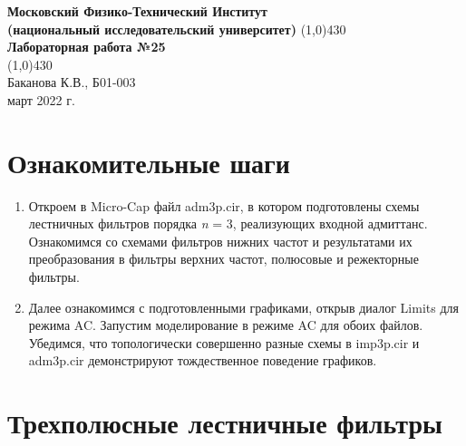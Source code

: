 \documentclass[a4paper, 12pt]{article}%
\begin{document}
\begin{titlepage}

\begin{center}
\large\textbf{Московский Физико-Технический Институт}\\
\large\textbf{(национальный исследовательский университет)}
\vfill
\line(1,0){430}\\[3mm]
\huge\textbf{Лабораторная работа №25}\\
\line(1,0){430}\\[1mm]
\vfill
\large Баканова К.В., Б01-003\\
\large март 2022 г.\\
\end{center}

\end{titlepage}
\section{Ознакомительные шаги}

\begin{enumerate}

\item Откроем в Micro-Cap файл adm3p.cir, в котором подготовлены схемы лестничных фильтров порядка \textit{n} = 3, реализующих входной адмиттанс. Ознакомимся со схемами фильтров нижних частот и результатами их преобразования в фильтры верхних частот, полюсовые и режекторные фильтры.

\item Далее ознакомимся с подготовленными графиками, открыв диалог Limits для режима AC. Запустим моделирование в режиме AC для обоих файлов. Убедимся, что топологически совершенно разные схемы в imp3p.cir и adm3p.cir демонстрируют тождественное поведение графиков.

\end{enumerate}


\section{Трехполюсные лестничные фильтры}
\end{document}
